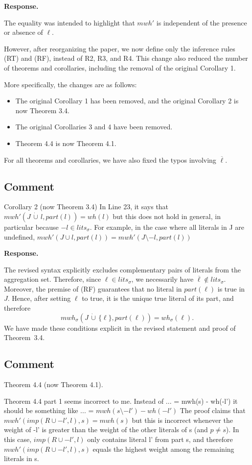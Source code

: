 \documentclass[11pt]{article}
\newcommand{\lits}{\mathit{lits}}
\newcommand{\mwh}{\mathit{mwh}}
\newcommand{\wh}{\mathit{wh}}
\newcommand{\cupdot}{\,\dot{\cup}\,}
\theoremstyle{definition}
\newcommand{\revieweranswered}{\subsection{Comment}}
\newenvironment{response}{
    \color{blue} \textbf{Response.}
}{
}
\begin{document}
\begin{response}
The equality was intended to highlight that $\mwh'$ is independent of the presence or absence of $\ell$.

However, after reorganizing the paper, we now define only the inference rules (RT) and (RF), instead of R2, R3, and R4. This change also reduced the number of theorems and corollaries, including the removal of the original Corollary 1.

More specifically, the changes are as follows:
\begin{itemize}
\item The original Corollary 1 has been removed, and the original Corollary 2 is now Theorem 3.4.
\item The original Corollaries 3 and 4 have been removed.
\item Theorem 4.4 is now Theorem 4.1.
\end{itemize}

For all theorems and corollaries, we have also fixed the typos involving $\overline{\ell}$.


\end{response}

\vspace{0.5cm}

\revieweranswered Corollary 2 (now Theorem 3.4)
In Line 23, it says that
$mwh'(J \cupdot l, part(l)) = wh(l)$
but this does not hold in general, in particular because
$-l \in lits_{\sigma}$.
For example, in the case where all literals in J are undefined,
$mwh'(J \cup l, part(l)) = mwh'(J \setminus {-l}, part(l))$

\begin{response}
The revised syntax explicitly excludes complementary pairs of literals from the aggregation set. Therefore, since $\ell \in \lits_\sigma$, we necessarily have $\overline{\ell}  \notin\lits_\sigma$. Moreover, the premise of (RF) guarantees that no literal in $\mathit{part}(\ell)$ is true in $J$. Hence, after setting $\ell$ to true, it is the unique true literal of its part, and therefore
$$
\mwh_\sigma(J\cupdot\{\ell\},\mathit{part}(\ell))=\wh_\sigma(\ell).
$$
We have made these conditions explicit in the revised statement and proof of Theorem~3.4.
\end{response}

\vspace{0.5cm}
\revieweranswered Theorem 4.4 (now Theorem 4.1).

Theorem 4.4 part 1 seems incorrect to me.
Instead of
... = mwh(s) - wh(-l')
it should be something like
... = $mwh(s \setminus {-l'}) - wh(-l')$
The proof claims that
$mwh'(imp(R \cup {-l'},l),s) = mwh(s)$
but this is incorrect whenever the weight of -l'
is greater than the weight of the other literals of s (and $p \neq s$).
In this case, $imp(R \cup {-l'},l)$ only contains literal l' from part s,
and therefore
$mwh'(imp(R \cup {-l'},l),s)$
equals the highest weight among the remaining literals in s.
\end{document}
